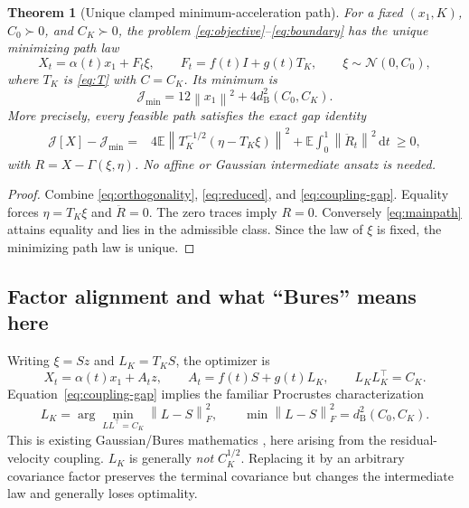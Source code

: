 \documentclass[11pt,letterpaper]{article}
\newcommand{\E}{\mathbb E}
\newcommand{\cN}{\mathcal N}
\newcommand{\dd}{\,\mathrm d}
\newcommand{\norm}[1]{\left\lVert#1\right\rVert}
\newcommand{\bures}{d_{\mathrm B}}
\newcommand{\J}{\mathcal J}
\newtheorem{theorem}{Theorem}
\begin{document}
\begin{theorem}[Unique clamped minimum-acceleration path]
\label{thm:main}
For a fixed $(x_1,K)$, $C_0\succ0$, and $C_K\succ0$, the problem \eqref{eq:objective}--\eqref{eq:boundary} has the unique minimizing path law
\begin{equation}
\boxed{X_t=\alpha(t)x_1+F_t\xi,\qquad F_t=f(t)I+g(t)T_K,
\qquad \xi\sim\cN(0,C_0),}
\label{eq:mainpath}
\end{equation}
where $T_K$ is \eqref{eq:T} with $C=C_K$. Its minimum is
\begin{equation}
\boxed{\J_{\min}=12\norm{x_1}^2+4\bures^2(C_0,C_K).}
\label{eq:Jmin}
\end{equation}
More precisely, every feasible path satisfies the exact gap identity
\begin{equation}
\begin{split}
\J[X]-\J_{\min}
={}&4\E\norm{T_K^{-1/2}(\eta-T_K\xi)}^2
+\E\int_0^1\norm{\ddot R_t}^2\dd t\ \geq0,
\end{split}
\label{eq:fullgap}
\end{equation}
with $R=X-\Gamma(\xi,\eta)$. No affine or Gaussian intermediate ansatz is needed.
\end{theorem}
\begin{proof}
Combine \eqref{eq:orthogonality}, \eqref{eq:reduced}, and \eqref{eq:coupling-gap}. Equality forces $\eta=T_K\xi$ and $\ddot R=0$. The zero traces imply $R=0$. Conversely \eqref{eq:mainpath} attains equality and lies in the admissible class. Since the law of $\xi$ is fixed, the minimizing path law is unique.
\end{proof}

\subsection{Factor alignment and what ``Bures'' means here}
Writing $\xi=Sz$ and $L_K=T_KS$, the optimizer is
\begin{equation}
X_t=\alpha(t)x_1+A_tz,\qquad A_t=f(t)S+g(t)L_K,\qquad L_KL_K^\top=C_K.
\label{eq:factor}
\end{equation}
Equation~\eqref{eq:coupling-gap} implies the familiar Procrustes characterization
\begin{equation}
L_K=\arg\min_{LL^\top=C_K}\norm{L-S}_F^2,\qquad
\min\norm{L-S}_F^2=\bures^2(C_0,C_K).
\label{eq:procrustes}
\end{equation}
This is existing Gaussian/Bures mathematics \cite{bhatia}, here arising from the residual-velocity coupling. $L_K$ is generally \emph{not} $C_K^{1/2}$. Replacing it by an arbitrary covariance factor preserves the terminal covariance but changes the intermediate law and generally loses optimality.
\end{document}
